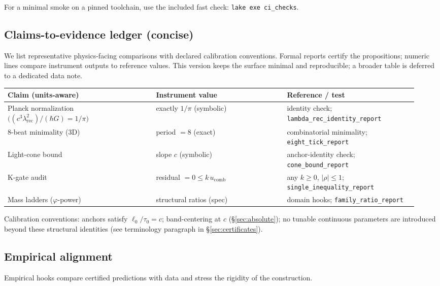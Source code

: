 \documentclass[11pt,a4paper,twoside]{article}
\numberwithin{equation}{section}
\theoremstyle{customthm}
\theoremstyle{customdef}
\theoremstyle{customrem}
\begin{document}
\noindent For a minimal smoke on a pinned toolchain, use the included fast check: \texttt{lake exe ci\_checks}.

\subsection{Claims-to-evidence ledger (concise)}\label{sec:claims-evidence}
We list representative physics-facing comparisons with declared calibration conventions. Formal reports certify the propositions; numeric lines compare instrument outputs to reference values. This version keeps the surface minimal and reproducible; a broader table is deferred to a dedicated data note.

\begin{center}
\small
\begin{tabular}{@{}p{0.34\linewidth} p{0.30\linewidth} p{0.30\linewidth}@{}}
\toprule
\textbf{Claim (units-aware)} & \textbf{Instrument value} & \textbf{Reference / test} \\
\midrule
Planck normalization $\big((c^3\lambda_{\mathrm{rec}}^2)/(\hbar G)=1/\pi\big)$ & exactly $1/\pi$ (symbolic) & identity check; \texttt{lambda\_rec\_identity\_report} \\
8-beat minimality (3D) & period $=8$ (exact) & combinatorial minimality; \texttt{eight\_tick\_report} \\
Light-cone bound & slope $c$ (symbolic) & anchor-identity check; \texttt{cone\_bound\_report} \\
K-gate audit & residual $=0\le k\,u_{\mathrm{comb}}$ & any $k\ge0$, $|\rho|\le1$; \texttt{single\_inequality\_report} \\
Mass ladders ($\varphi$-power) & structural ratios (spec) & domain hooks; \texttt{family\_ratio\_report} \\
\bottomrule
\end{tabular}
\end{center}

Calibration conventions: anchors satisfy $\ell_0/\tau_0=c$; band-centering at $c$ (\S\ref{sec:absolute}); no tunable continuous parameters are introduced beyond these structural identities (see terminology paragraph in \S\ref{sec:certificates}).

\subsection{Empirical alignment}

Empirical hooks compare certified predictions with data and stress the rigidity of the construction.
\end{document}
